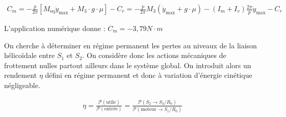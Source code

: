 
\ifprof\begin{corrige}
\begin{align*}
C_m=-\frac{p}{2\pi}\left[M_{\text{eq}}\ddot{y}_{\text{max}}+M_3\cdot g\cdot \mu\right]-C_r
=-\frac{p}{2\pi}M_3\left(\ddot{y}_{\text{max}}+g\cdot \mu\right)-\left(I_m+I_v\right)\frac{2\pi}{p}\ddot{y}_{\text{max}}-C_r
\end{align*}

L'application numérique donne  : $C_m=-3,79N\cdot m$
\end{corrige}\else\fi




On cherche à déterminer en régime permanent les pertes au niveaux de la liaison hélicoïdale entre $S_1$ et $S_2$. On considère donc les actions mécaniques de frottement nulles partout ailleurs dans le système global. On introduit alors un rendement $\eta$ défini en régime permanent et donc à variation d'énergie cinétique négligeable.


\ifprof\begin{corrige}
\begin{align*}
\eta=\frac{\mathcal{P}(\text{utile})}{\mathcal{P}(\text{entrée})}=\frac{\mathcal{P}(S_2\to S_3/R_0)}{\mathcal{P}(\text{moteur}\to S_1/R_0)}
\end{align*}
\end{corrige}\else\fi


